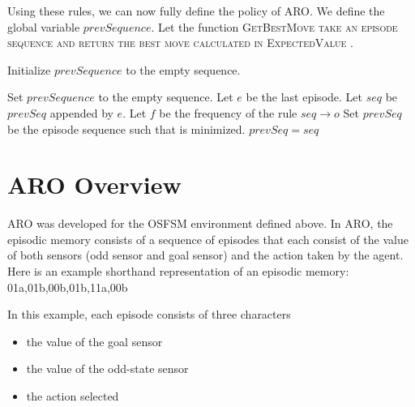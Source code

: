 \documentclass[letterpaper]{article} %
\begin{document}
Using these rules, we can now fully define the policy of ARO. We define the global variable $prevSequence$. Let the function \scshape GetBestMove \normalfont take an episode sequence and return the best move calculated in \scshape ExpectedValue \normalfont.

\begin{algorithmic}
	
	\State Initialize $prevSequence$ to the empty sequence.

			\State Set $prevSequence$ to the empty sequence.
			\State \Return
		\EndIf
		\State Let $e$ be the last episode.
		\State Let $seq$ be $prevSeq$ appended by $e$.
		\State Let $f$ be the frequency of the rule $seq \rightarrow o$
			\State Set $prevSeq$ be the episode sequence such that  is minimized.
			\State \Return {}
		\Else
			\State $prevSeq = seq$
			\State \Return {}
		\EndIf
		
	\EndFunction
	
\end{algorithmic}



\section{ARO Overview}

ARO was developed for the OSFSM environment defined above.  In ARO,
the episodic memory consists of a sequence of episodes that each
consist of the value of both sensors (odd sensor and goal sensor) and
the action taken by the agent.  Here is an example shorthand
representation of an episodic memory: 01a,01b,00b,01b,11a,00b

In this example, each episode consists of three characters
\begin{itemize}
\item the value of the goal sensor
\item the value of the odd-state sensor
\item the action selected
\end{itemize}
\end{document}
